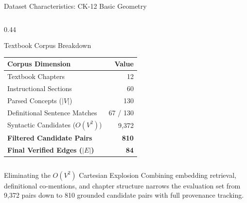 \documentclass[aspectratio=169,10pt]{beamer}
\begin{document}
\begin{frame}{Dataset Characteristics: CK-12 Basic Geometry}
\begin{columns}[T]
        \begin{column}{0.44\textwidth}
            \begin{block}{Textbook Corpus Breakdown}
                \centering
                \footnotesize
                \begin{tabular}{lr}
                    \toprule
                    \textbf{Corpus Dimension} & \textbf{Value} \\
                    \midrule
                    Textbook Chapters & 12 \\
                    Instructional Sections & 60 \\
                    Parsed Concepts ($|V|$) & 130 \\
                    Definitional Sentence Matches & 67 / 130 \\
                    Syntactic Candidates ($O(V^2)$) & 9,372 \\
                    \textbf{Filtered Candidate Pairs} & \textbf{810} \\
                    \textbf{Final Verified Edges ($|E|$)} & \textbf{84} \\
                    \bottomrule
                \end{tabular}
            \end{block}
        \end{column}
    \end{columns}

    \vspace{0.2cm}
    \begin{alertblock}{Eliminating the $O(V^2)$ Cartesian Explosion}
        \footnotesize Combining embedding retrieval, definitional co-mentions, and chapter structure narrows the evaluation set from 9,372 pairs down to 810 grounded candidate pairs with full provenance tracking.
    \end{alertblock}
\end{frame}
\end{document}
